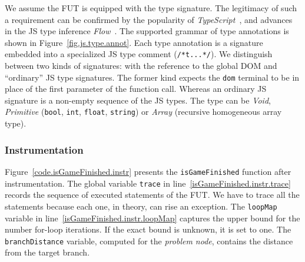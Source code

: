 \documentclass[sigconf,review]{acmart}
\begin{document}
We assume the FUT is equipped with the type signature. The legitimacy of such a requirement can be confirmed by the popularity of \emph{TypeScript}~\cite{typescript}, and advances in the JS type inference \emph{Flow}~\cite{flow}. The supported grammar of type annotations is shown in Figure~\ref{fig.js.type.annot}. Each type annotation is a signature embedded into a specialized JS type comment (\texttt{/*t...*/}). We distinguish between two kinds of signatures: with the reference to the global DOM and ``ordinary'' JS type signatures. The former kind expects the \texttt{dom} terminal to be in place of the first parameter of the function call. Whereas an ordinary JS signature is a non-empty sequence of the JS types. The type can be \emph{Void}, \emph{Primitive} (\texttt{bool}, \texttt{int}, \texttt{float}, \texttt{string}) or \emph{Array} (recursive homogeneous array type).  

\subsubsection{Instrumentation}
\label{sub.sec.instrument}

Figure~\ref{code.isGameFinished.instr} presents the \texttt{isGameFinished} function after instrumentation. The global variable \texttt{trace} in line~\ref{isGameFinished.instr.trace} records the sequence of executed statements of the FUT. We have to trace all the statements because each one, in theory, can rise an exception. The \texttt{loopMap} variable in line~\ref{isGameFinished.instr.loopMap} captures the upper bound for the number for-loop iterations. If the exact bound is unknown, it is set to one. The \texttt{branchDistance} variable, computed for the \emph{problem node}, contains the distance~\cite{tracey1998automated} from the target branch.

\end{document}
